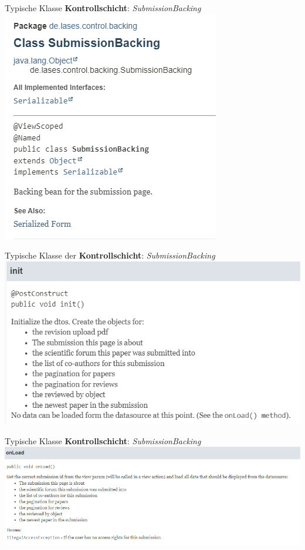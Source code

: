 \documentclass{beamer}
\begin{document}
    \begin{frame}{Typische Klasse \textbf{Kontrollschicht}: \emph{SubmissionBacking}}
        \centering
        \includegraphics[height=0.7\textheight]{graphics/backing/doc_backing}
    \end{frame}
    \begin{frame}{Typische Klasse der \textbf{Kontrollschicht}: \emph{SubmissionBacking}}
        \centering
        \includegraphics[height=0.6\textheight]{graphics/backing/doc_init}
    \end{frame}
    \begin{frame}{Typische Klasse \textbf{Kontrollschicht}: \emph{SubmissionBacking}}
        \centering
        \includegraphics[height=0.6\textheight]{graphics/backing/doc_onLoad}
    \end{frame}
\end{document}
